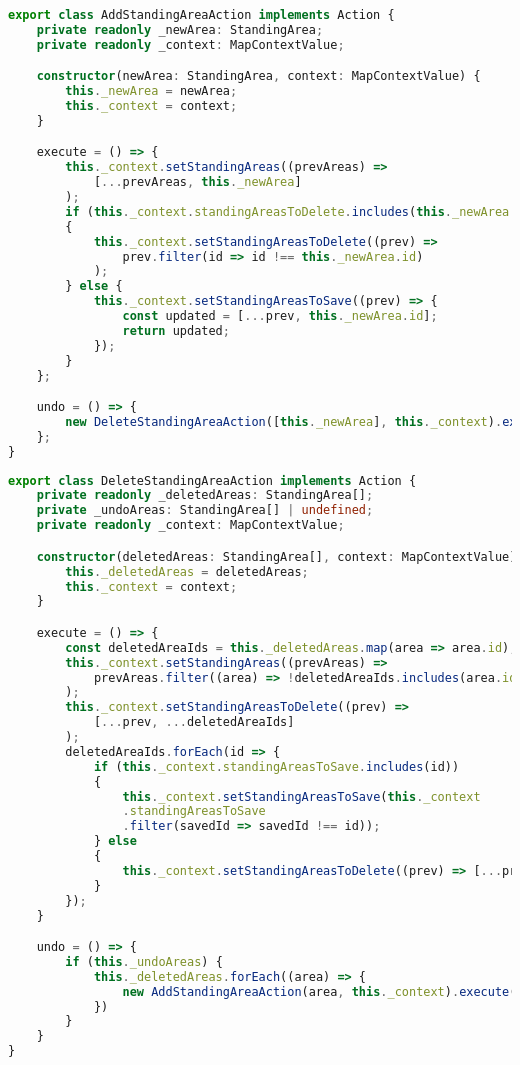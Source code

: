 \begin{lstlisting}[language=TypeScript,caption={Add standing-area action implementation},label={lst:add-standing-area-action-implementation}]
export class AddStandingAreaAction implements Action {
    private readonly _newArea: StandingArea;
    private readonly _context: MapContextValue;

    constructor(newArea: StandingArea, context: MapContextValue) {
        this._newArea = newArea;
        this._context = context;
    }

    execute = () => {
        this._context.setStandingAreas((prevAreas) => 
            [...prevAreas, this._newArea]
        );
        if (this._context.standingAreasToDelete.includes(this._newArea.id))
        {
            this._context.setStandingAreasToDelete((prev) =>
                prev.filter(id => id !== this._newArea.id)
            );
        } else {
            this._context.setStandingAreasToSave((prev) => {
                const updated = [...prev, this._newArea.id];
                return updated;
            });
        }
    };

    undo = () => {
        new DeleteStandingAreaAction([this._newArea], this._context).execute()
    };
}
\end{lstlisting}

\begin{lstlisting}[language=TypeScript,caption={Delete standing-area action implementation},label={lst:delete-standing-area-action-implementation}]
export class DeleteStandingAreaAction implements Action {
    private readonly _deletedAreas: StandingArea[];
    private _undoAreas: StandingArea[] | undefined;
    private readonly _context: MapContextValue;

    constructor(deletedAreas: StandingArea[], context: MapContextValue) {
        this._deletedAreas = deletedAreas;
        this._context = context;
    }

    execute = () => {
        const deletedAreaIds = this._deletedAreas.map(area => area.id);
        this._context.setStandingAreas((prevAreas) =>
            prevAreas.filter((area) => !deletedAreaIds.includes(area.id))
        );
        this._context.setStandingAreasToDelete((prev) => 
            [...prev, ...deletedAreaIds]
        );
        deletedAreaIds.forEach(id => {
            if (this._context.standingAreasToSave.includes(id)) 
            {
                this._context.setStandingAreasToSave(this._context
                .standingAreasToSave
                .filter(savedId => savedId !== id));
            } else 
            {
                this._context.setStandingAreasToDelete((prev) => [...prev, id]);
            }
        });
    }

    undo = () => {
        if (this._undoAreas) {
            this._deletedAreas.forEach((area) => {
                new AddStandingAreaAction(area, this._context).execute()
            })
        }
    }
}
\end{lstlisting}

